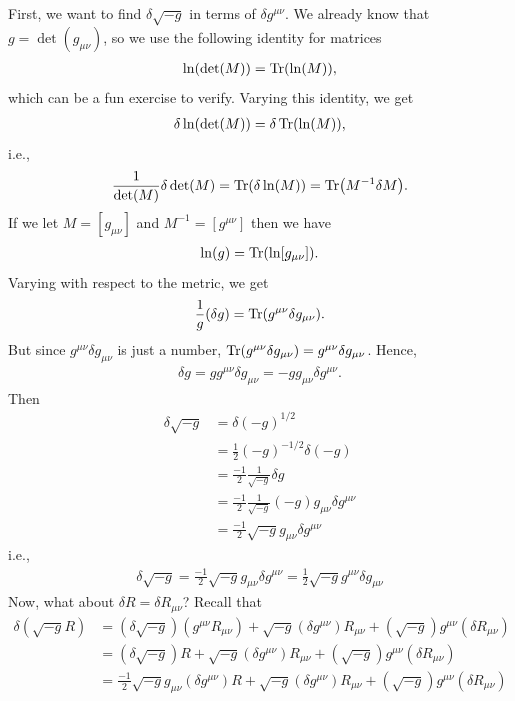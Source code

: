 \documentclass[a4paper,11pt]{article}
\numberwithin{equation}{section}
\theoremstyle{definition}
\newcommand{\nn}{\nonumber}
\newcommand{\f}[2]{\frac{#1}{#2}}
\begin{document}
First, we want to find $\delta \sqrt{-g}$ in terms of $\delta g^{\mu\nu}$. We already know that $g = \det(g_{\mu\nu})$, so we use the following identity for matrices
\begin{align}
\ln(\det(M)) = \Tr(\ln(M)),
\end{align}
which can be a fun exercise to verify. Varying this identity, we get
\begin{align}
\delta \ln(\det(M)) = \delta \Tr(\ln(M)),
\end{align}
i.e.,
\begin{align}
\f{1}{\det(M)}\delta \det(M) = \Tr(\delta \ln(M)) = \Tr(M^{-1}\delta M).
\end{align}
If we let $M = [g_{\mu\nu}]$ and $M^{-1} = [g^{\mu\nu}]$ then we have
\begin{align}
\ln(g) = \Tr(\ln[g_{\mu\nu}]).
\end{align}
Varying with respect to the metric, we get
\begin{align}
\f{1}{g}(\delta g) = \Tr(g^{\mu\nu}\delta g_{\mu\nu}).
\end{align}
But since $g^{\mu\nu}\delta g_{\mu\nu}$ is just a number, $\Tr(g^{\mu\nu}\delta g_{\mu\nu}) = g^{\mu\nu}\delta g_{\mu\nu}$. Hence,
\begin{align}
\boxed{\delta g = g g^{\mu\nu}\delta g_{\mu\nu} = -gg_{\mu\nu}\delta g^{\mu\nu}}.
\end{align}
Then
\begin{align}
\delta \sqrt{-g} &= \delta (-g)^{1/2\nn}\\
& = \f{1}{2}(-g)^{-1/2}\delta (-g) \nn\\
&= \f{-1}{2}\f{1}{\sqrt{-g}}\delta g \nn\\
&= \f{-1}{2}\f{1}{\sqrt{-g}}(-g)g_{\mu\nu}\delta g^{\mu\nu}\nn\\
&= \f{-1}{2}\sqrt{-g}g_{\mu\nu} \delta g^{\mu\nu}
\end{align}
i.e.,
\begin{align}
\boxed{\delta \sqrt{-g} = \f{-1}{2}\sqrt{-g}g_{\mu\nu} \delta g^{\mu\nu} = \f{1}{2}\sqrt{-g}g^{\mu\nu}\delta g_{\mu\nu}}
\end{align}
Now, what about $\delta R = \delta R_{\mu\nu}$? Recall that
\begin{align}
\delta (\sqrt{-g} R) &= (\delta \sqrt{-g})(g^{\mu\nu}R_{\mu\nu}) + \sqrt{-g}(\delta g^{\mu\nu})R_{\mu\nu} + (\sqrt{-g})g^{\mu\nu}(\delta R_{\mu\nu})\nn\\
&= (\delta \sqrt{-g})R + \sqrt{-g}(\delta g^{\mu\nu})R_{\mu\nu} + (\sqrt{-g})g^{\mu\nu}(\delta R_{\mu\nu})\nn\\
&= \f{-1}{2}\sqrt{-g}g_{\mu\nu}( \delta g^{\mu\nu})R + \sqrt{-g}(\delta g^{\mu\nu})R_{\mu\nu} + (\sqrt{-g})g^{\mu\nu}(\delta R_{\mu\nu})
\end{align} 
\end{document}
